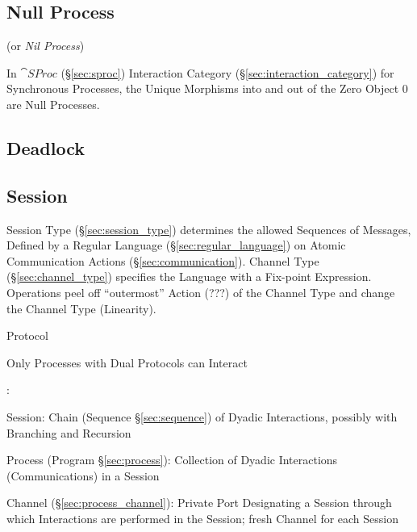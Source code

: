 \subsection{Null Process}\label{sec:null_process}

(or \emph{Nil Process})

In $\cat{SProc}$ (\S\ref{sec:sproc}) Interaction Category
(\S\ref{sec:interaction_category}) for Synchronous Processes, the
Unique Morphisms into and out of the Zero Object $0$ are Null
Processes.



\subsection{Deadlock}\label{sec:deadlock}

\subsection{Session}\label{sec:session}

Session Type (\S\ref{sec:session_type}) determines the allowed
Sequences of Messages, Defined by a Regular Language
(\S\ref{sec:regular_language}) on Atomic Communication Actions
(\S\ref{sec:communication}). Channel Type (\S\ref{sec:channel_type})
specifies the Language with a Fix-point Expression. Operations peel
off ``outermost'' Action (???) of the Channel Type and change the
Channel Type (Linearity). \cite{neubauer-thiemann04}

Protocol

Only Processes with Dual Protocols can Interact

\cite{honda-vasconcelos-kubo98}:

Session: Chain (Sequence \S\ref{sec:sequence}) of Dyadic Interactions,
possibly with Branching and Recursion

Process (Program \S\ref{sec:process}): Collection of Dyadic
Interactions (Communications) in a Session

Channel (\S\ref{sec:process_channel}): Private Port Designating a
Session through which Interactions are performed in the Session; fresh
Channel for each Session

